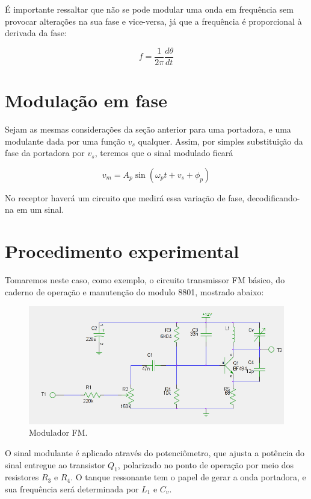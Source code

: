 \documentclass[]{report}
\begin{document}
É importante ressaltar que não se pode modular uma onda em frequência sem provocar alterações na sua fase e vice-versa, já que a frequência é proporcional à derivada da fase:

\begin{equation}
f = \frac{1}{2\pi} \frac{d\theta}{dt}
\end{equation}
\section{Modulação em fase}

Sejam as mesmas considerações da seção anterior para uma portadora, e uma modulante dada por uma função $v_s$ qualquer. Assim, por simples substituição da fase da portadora por $v_s$, teremos que o sinal modulado ficará

\begin{equation}\label{modulada_PM}
v_m = A_p \sin(\omega_p t + v_s + \phi_p)
\end{equation}

No receptor haverá um circuito que medirá essa variação de fase, decodificando-na em um sinal.

\section{Procedimento experimental}
Tomaremos neste caso, como exemplo, o circuito transmissor FM básico, do caderno de operação e manutenção do modulo 8801, mostrado abaixo:

\begin{figure}[H]
\begin{center}
\includegraphics[scale=0.5,clip]{./imagens/FM_Modulator.png}
\end{center}
\caption{Modulador FM.}
\label{fig:modulador_FM}
\end{figure}

O sinal modulante é aplicado através do potenciômetro, que ajusta a potência do sinal entregue ao transistor $Q_1$, polarizado no ponto de operação por meio dos resistores $R_3$ e $R_4$. O tanque ressonante tem o papel de gerar a onda portadora, e sua frequência será determinada por $L_1$ e $C_v$.
\end{document}
